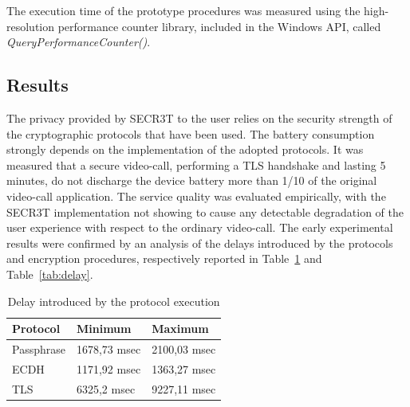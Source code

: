 \documentclass[10pt, conference, compsocconf]{IEEEtran}
\begin{document}
The execution time of the prototype procedures was measured using the high-resolution performance counter library, included in the Windows API, called \textit{QueryPerformanceCounter()}.


\subsection{Results}
\label{par:measure}
The privacy provided by SECR3T to the user relies on the security strength of the cryptographic protocols that have been used.
The battery consumption strongly depends on the implementation of the adopted protocols. It was measured that a secure video-call, performing a TLS handshake and lasting 5 minutes, do not discharge the device battery more than 1/10 of the original video-call application.
The service quality was evaluated empirically, with the SECR3T implementation not showing to cause any detectable degradation of the user experience with respect to the ordinary video-call. The early experimental results were confirmed by an analysis of the delays introduced by the protocols and encryption procedures, respectively reported in Table~\ref{tab:delay_pp} and Table~\ref{tab:delay}.

\begin{table}[htbp]
\caption{Delay introduced by the protocol execution}
\centering

\begin{tabular}{| l | l | l |}
\hline
\textbf{Protocol} & \textbf{Minimum} & \textbf{Maximum}\\
\hline
Passphrase &  1678,73 msec & 2100,03 msec\\
\hline
ECDH & 1171,92 msec & 1363,27 msec\\
\hline
TLS & 6325,2 msec & 9227,11 msec \\
\hline

\end{tabular}

\label{tab:delay_pp}
\end{table}
\end{document}
